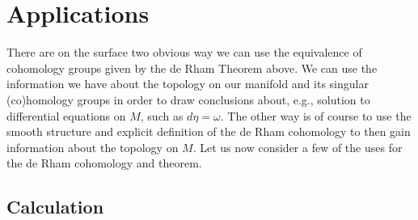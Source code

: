 \documentclass[a4paper, 12pt]{article}
\begin{document}
\section{Applications}

There are on the surface two obvious way we can use the equivalence of
cohomology groups given by the de Rham Theorem above.  We can use the
information we have about the topology on our manifold and its singular
(co)homology groups in order to draw conclusions about, e.g., solution to
differential equations on $M$, such as $d\eta = \omega$. The other way is of
course to use the smooth structure and explicit definition of the de Rham
cohomology to then gain information about the topology on $M$.
Let us now consider a few of the uses for the de Rham cohomology and theorem.

\subsection{Calculation}
\end{document}
